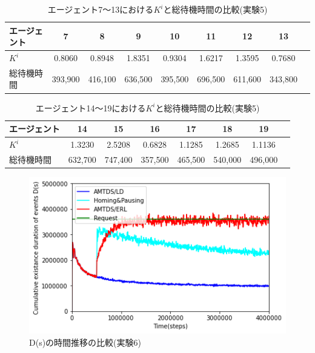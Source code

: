\documentclass[12pt,a4j,twoside]{jarticle}
\begin{document}
  \begin{table}
    \centering
    \caption{エージェント7～13における$K^i$と総待機時間の比較(実験5)}
    \begin{tabular}{lcccccccr}\\ \hline
      エージェント & 7 & 8 & 9 & 10 & 11 & 12 & 13 \\ \hline
      $K^i$  & 0.8060 & 0.8948 & 1.8351 & 0.9304 & 1.6217 & 1.3595 & 0.7680 \\ \hline
      総待機時間 & 393,900 & 416,100 & 636,500 & 395,500 & 696,500 & 611,600 & 343,800 \\ \hline      
    \end{tabular}
    \label{tb:ERL_Office_k2}
  \end{table}

  \begin{table}
    \centering
    \caption{エージェント14～19における$K^i$と総待機時間の比較(実験5)}
    \begin{tabular}{lccccccr}\\ \hline
      エージェント & 14 & 15 & 16 & 17 & 18 & 19 \\ \hline
      $K^i$  & 1.3230 & 2.5208 & 0.6828 & 1.1285 & 1.2685 & 1.1136 \\ \hline
      総待機時間 & 632,700 & 747,400 & 357,500 & 465,500 & 540,000 & 496,000 \\ \hline      
    \end{tabular}
    \label{tb:ERL_Office_k3}
  \end{table}

  \begin{figure}
    \centering
    \includegraphics[width=150mm]{figures/ds_graph_3600_ave_ERL_Complex_1000.png}
    \caption{D(s)の時間推移の比較(実験6)}
    \label{fig:ds_ERL_Complex}
  \end{figure}
\end{document}
